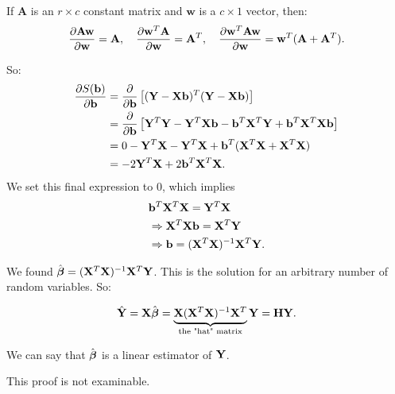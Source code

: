 \begin{remark}
	If $\mathbf A$ is an $r\times c$ constant matrix and $\mathbf w$ is a $c\times 1$ vector, then:
	\begin{align*}
			\pder[\mathbf A \mathbf w]{\mathbf w}=\mathbf A, \quad \pder[\mathbf w^T \mathbf A]{\mathbf w}=\mathbf A^T, \quad \pder[\mathbf w^T \mathbf A\mathbf w]{\mathbf w}=\mathbf w^T(\mathbf A+\mathbf A^T).
	\end{align*}
\end{remark}

So: 
\begin{align*}
		\pder[S(\bee)]{\bee}&=\pder{\bee}\left[ (\YY-\XX\bee)^T(\YY-\XX\bee) \right]\\ 
			    &= \pder{\bee} \left[ \YY^T\YY-\YY^T\XX\bee-\bee^T\XX^T\YY+\bee^T\XX^T\XX\bee \right]  \\
			    &= 0 - \YY^T\XX - \YY^T\XX+\bee^T(\XX^T\XX+\XX^T\XX)\\
				&=-2\YY^T\XX+2\bee^T\XX^T\XX
.\end{align*}
We set this final expression to 0, which implies
\begin{align*}
	&\bee^T \XX^T\XX = \YY^T\XX \\
	&\implies \XX^T\XX\bee = \XX^T\YY \\
	&\implies \bee = (\XX^T\XX)^{-1}\XX^T\YY  
.\end{align*}

We found $\hat{\bbeta}=(\XX^T\XX)^{-1}\XX^T\YY$. This is the solution for an arbitrary number of random variables. So:

\[
	\hat{\YY}=\XX \hat{\bbeta} = \underbrace{\XX(\XX^T\XX)^{-1}\XX^T}_{\text{the "hat" matrix}}\YY=\mathbf{H}\YY.
\] 
\begin{definition}
We can say that $\hat{\bbeta}$ is a linear estimator of $\YY$. 
\end{definition}

\begin{note}
	This proof is not examinable.
\end{note}
